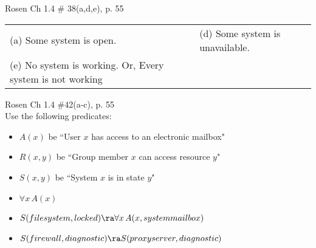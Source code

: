 \begin{questions}
 Rosen Ch 1.4 \# 38(a,d,e), p. 55
    \ifprintanswers
        \vspace{-12pt}
    \fi
  \begin{solution}
      \begin{tabular}{ll} 
        (a) Some system is open. & (d) Some system is unavailable. \\
        (e) No system is working.  Or, Every system is not working
      \end{tabular}
  \end{solution}


 Rosen Ch 1.4 \#42(a-c), p. 55\\
Use the following predicates:
  \begin{itemize}[itemsep=0pt,parsep=0pt,topsep=0pt,partopsep=0pt]
    \item $A(x)$ be ``User $x$ has access to an electronic mailbox"
    \item $R(x,y)$ be ``Group member $x$ can access resource $y$"
    \item $S(x,y)$ be ``System $x$ is in state $y$"
  \end{itemize}
    \ifprintanswers
        \vspace{-12pt}
    \fi
  \begin{solution}
    \begin{itemize}[itemsep=0pt,parsep=0pt,topsep=0pt,partopsep=0pt]
      \item $\forall x\, A(x)$
      \item $S(file system, locked) \ra  \forall x\, A(x, system mailbox)$
      \item $S(firewall, diagnostic) \ra S(proxy server, diagnostic)$
    \end{itemize}
  \end{solution}



\end{questions}
